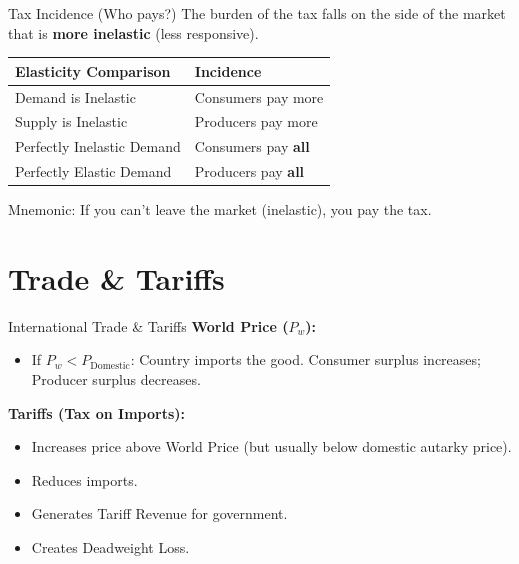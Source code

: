 \documentclass[aspectratio=169]{beamer}
\begin{document}
\begin{frame}{Tax Incidence (Who pays?)}
    The burden of the tax falls on the side of the market that is \textbf{more inelastic} (less responsive).
    
    \begin{table}[]
    \centering
    \begin{tabular}{|l|l|}
    \hline
    \textbf{Elasticity Comparison} & \textbf{Incidence} \\ \hline
    Demand is Inelastic & Consumers pay more \\ \hline
    Supply is Inelastic & Producers pay more \\ \hline
    Perfectly Inelastic Demand & Consumers pay \textbf{all} \\ \hline
    Perfectly Elastic Demand & Producers pay \textbf{all} \\ \hline
    \end{tabular}
    \end{table}
    \footnotesize{Mnemonic: If you can't leave the market (inelastic), you pay the tax.}
\end{frame}

\section{Trade & Tariffs}

\begin{frame}{International Trade & Tariffs}
    \textbf{World Price ($P_w$):}
    \begin{itemize}
        \item If $P_w < P_{\text{Domestic}}$: Country imports the good. Consumer surplus increases; Producer surplus decreases.
    \end{itemize}

    \textbf{Tariffs (Tax on Imports):}
    \begin{itemize}
        \item Increases price above World Price (but usually below domestic autarky price).
        \item Reduces imports.
        \item Generates Tariff Revenue for government.
        \item Creates Deadweight Loss.
    \end{itemize}
\end{frame}
\end{document}
